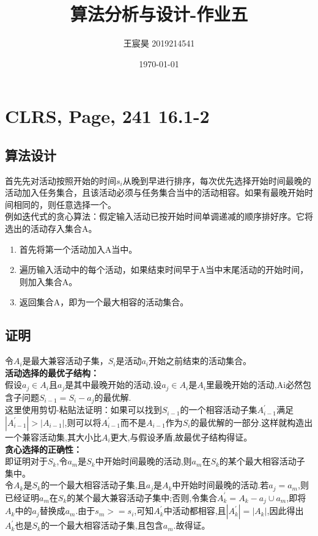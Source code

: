 \documentclass[UTF8]{ctexart}
\title{算法分析与设计-作业五}
\author{王宸昊 2019214541}
\date{\today}
\begin{document}
\maketitle


\section{CLRS, Page, 241 16.1-2}

\subsection{算法设计}
首先先对活动按照开始的时间$s_i$从晚到早进行排序，每次优先选择开始时间最晚的活动加入任务集合，且该活动必须与任务集合当中的活动相容。如果有最晚开始时间相同的，则任意选择一个。\\
例如迭代式的贪心算法：假定输入活动已按开始时间单调递减的顺序排好序。它将选出的活动存入集合A。
\begin{enumerate}[1.]

    \item 首先将第一个活动加入A当中。
    \item 遍历输入活动中的每个活动，如果结束时间早于A当中末尾活动的开始时间，则加入集合A。
    \item 返回集合A，即为一个最大相容的活动集合。
    
\end{enumerate}

\subsection{证明}
令$A_i$是最大兼容活动子集，$S_i$是活动$a_i$开始之前结束的活动集合。\\
\textbf{活动选择的最优子结构：}\\
假设$a_j \in A_i$且$a_j$是其中最晚开始的活动,设$a_j \in A_i$是$A_i$里最晚开始的活动,A{i}必然包含子问题$S_{i-1}=S_{i}-{a_j}$的最优解.\\
这里使用剪切-粘贴法证明：如果可以找到$S_{i-1}$的一个相容活动子集$A^\prime_{i-1}$满足$|A^\prime_{i-1}|>|A_{i-1}|$,则可以将$A^\prime_{i-1}$而不是$A_{i-1}$作为$S_i$的最优解的一部分.这样就构造出一个兼容活动集,其大小比$A_i$更大,与假设矛盾,故最优子结构得证。\\
\textbf{贪心选择的正确性：}\\
即证明对于$S_k$,令$a_m$是$S_k$中开始时间最晚的活动,则$a_m$在$S_k$的某个最大相容活动子集中。\\
令$A_k$是$S_k$的一个最大相容活动子集,且$a_j$是$A_k$中开始时间最晚的活动.若$a_j=a_m$,则已经证明$a_m$在$S_k$的某个最大兼容活动子集中;否则,令集合$A^\prime_k=A_k-{a_j}\cup {a_m}$,即将$A_k$中的$a_j$替换成$a_m$.由于$s_m>=s_i$,可知$A^\prime_k$中活动都相容,且$|A^\prime_k|=|A_k|$,因此得出$A^\prime_k$也是$S_k$的一个最大相容活动子集,且包含$a_m$.故得证。
\end{document}
